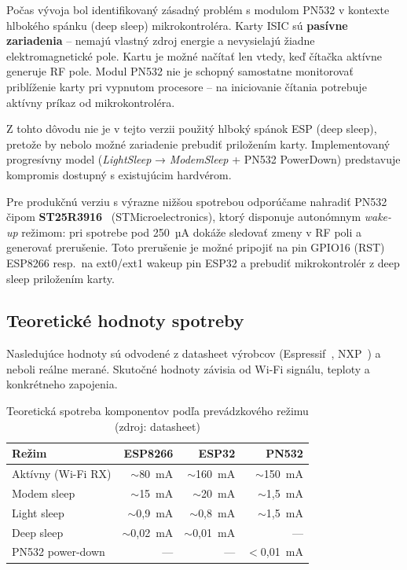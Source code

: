 Počas vývoja bol identifikovaný zásadný problém s modulom PN532 v kontexte hlbokého spánku (deep sleep) mikrokontroléra. Karty ISIC sú \textbf{pasívne zariadenia} -- nemajú vlastný zdroj energie a nevysielajú žiadne elektromagnetické pole. Kartu je možné načítať len vtedy, keď čítačka aktívne generuje RF pole. Modul PN532 nie je schopný samostatne monitorovať priblíženie karty pri vypnutom procesore -- na iniciovanie čítania potrebuje aktívny príkaz od mikrokontroléra.

Z tohto dôvodu nie je v tejto verzii použitý hlboký spánok ESP (deep sleep), pretože by nebolo možné zariadenie prebudiť priložením karty. Implementovaný progresívny model (\textit{LightSleep} → \textit{ModemSleep} + PN532 PowerDown) predstavuje kompromis dostupný s existujúcim hardvérom.

Pre produkčnú verziu s výrazne nižšou spotrebou odporúčame nahradiť PN532 čipom \textbf{ST25R3916}~\cite{st:st25r3916} (STMicroelectronics), ktorý disponuje autonómnym \textit{wake-up} režimom: pri spotrebe pod 250~µA dokáže sledovať zmeny v RF poli a generovať prerušenie. Toto prerušenie je možné pripojiť na pin GPIO16 (RST) ESP8266 resp.\ na ext0/ext1 wakeup pin ESP32 a prebudiť mikrokontrolér z deep sleep priložením karty.

\subsection*{Teoretické hodnoty spotreby}

Nasledujúce hodnoty sú odvodené z datasheet výrobcov (Espressif~\cite{espressif:esp8266-trm,espressif:esp32-trm}, NXP~\cite{nxp:pn532-um}) a neboli reálne merané. Skutočné hodnoty závisia od Wi-Fi signálu, teploty a konkrétneho zapojenia.

\begin{table}[h!]
  \centering
  \caption{Teoretická spotreba komponentov podľa prevádzkového režimu (zdroj: datasheet)}
  \label{tab:power-consumption}
  \begin{tabular}{lrrr}
    \toprule
    Režim & ESP8266 & ESP32 & PN532 \\
    \midrule
    Aktívny (Wi-Fi RX)    & $\sim$80~mA   & $\sim$160~mA  & $\sim$150~mA \\
    Modem sleep           & $\sim$15~mA   & $\sim$20~mA   & $\sim$1,5~mA \\
    Light sleep           & $\sim$0,9~mA  & $\sim$0,8~mA  & $\sim$1,5~mA \\
    Deep sleep            & $\sim$0,02~mA & $\sim$0,01~mA & --- \\
    PN532 power-down      & ---           & ---           & $<$0,01~mA \\
    \bottomrule
  \end{tabular}
\end{table}

